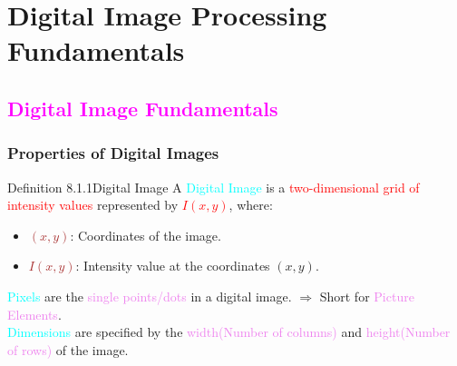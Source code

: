 \documentclass{book}
\begin{document}
\chapter{Digital Image Processing Fundamentals}
\textcolor{magenta}{\section{\textbf{Digital Image Fundamentals}}}
\subsection{Properties of Digital Images}
\begin{defBox}{Definition 8.1.1}{Digital Image}
    A \textcolor{cyan}{Digital Image} is a \textcolor{red}{two-dimensional grid of intensity values} represented by \textcolor{red}{$I(x,y)$}, where:
    \begin{itemize}
        \item \textcolor{brown}{\((x,y)\)}: Coordinates of the image.
        \item \textcolor{brown}{\(I(x,y)\)}: Intensity value at the coordinates \((x,y)\).
    \end{itemize}
\end{defBox}
\textcolor{cyan}{Pixels} are the \textcolor{violet}{single points/dots} in a digital image. $\Rightarrow$ Short for \textcolor{violet}{Picture Elements}.\\

\textcolor{cyan}{Dimensions} are specified by the \textcolor{violet}{width(Number of columns)} and \textcolor{violet}{height(Number of rows)} of the image.\\
\end{document}
